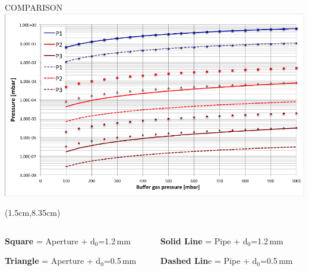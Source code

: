 \documentclass[9pt]{beamer}
\begin{document}
\begin{frame}{COMPARISON}
    \centering
    \includegraphics[scale=0.7]{assets/he_fin.pdf}
    \begin{textblock*}{11cm}(1.5cm,8.35cm)
    \begin{columns}
        \begin{column}{0.5\textwidth}
            \textbf{Square} = Aperture + d$_0$=1.2\,mm
            
            \textbf{Triangle} = Aperture + d$_0$=0.5\,mm
        \end{column}
        \begin{column}{0.5\textwidth}  %
            \textbf{Solid Line} = Pipe + d$_0$=1.2\,mm
            
            \textbf{Dashed Lin}e = Pipe + d$_0$=0.5\,mm
        \end{column}
    \end{columns}
    \end{textblock*}
\end{frame}
\end{document}
